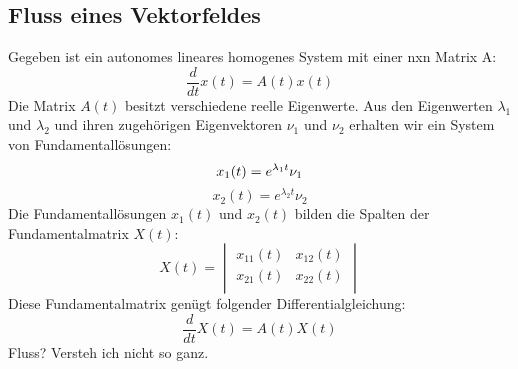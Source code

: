\subsection{Fluss eines Vektorfeldes}
Gegeben ist ein autonomes lineares homogenes System mit einer nxn Matrix A:
\begin{equation*}
\frac{d}{dt}x(t) = A(t)x(t)
\end{equation*}
Die Matrix $A(t)$ besitzt verschiedene reelle Eigenwerte. Aus den Eigenwerten $\lambda_1$ und $\lambda_2$ und ihren zugehörigen Eigenvektoren $\nu_1$ und $\nu_2$ erhalten wir ein System von Fundamentallösungen: 
\begin{equation*}
x_1(t) = e^{\lambda_1t}\nu_1\\
\end{equation*}
\begin{equation*}
x_2(t) = e^{\lambda_2t}\nu_2
\end{equation*}
Die Fundamentallösungen $x_1(t)$ und $x_2(t)$ bilden die Spalten der Fundamentalmatrix $X(t)$:
\begin{equation*}
	X(t) =     
	\begin{vmatrix} 
	        x_{11}(t) & x_{12}(t)\\ 
	        x_{21}(t) & x_{22}(t)\\   
	\end{vmatrix}
\end{equation*}
Diese Fundamentalmatrix genügt folgender Differentialgleichung: 
\begin{equation*}
\frac{d}{dt}X(t) = A(t)X(t)
\end{equation*}
Fluss? Versteh ich nicht so ganz. 

